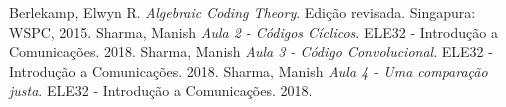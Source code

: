 \begin{thebibliography}{1}

Berlekamp, Elwyn R. \emph{Algebraic Coding Theory}. Edição revisada. Singapura: WSPC, 2015. 
Sharma, Manish \emph{Aula 2 - Códigos Cíclicos}. ELE32 - Introdução a Comunicações. 2018.
Sharma, Manish \emph{Aula 3 - Código Convolucional}. ELE32 - Introdução a Comunicações. 2018.
Sharma, Manish \emph{Aula 4 - Uma comparação justa}. ELE32 - Introdução a Comunicações. 2018.

\end{thebibliography}